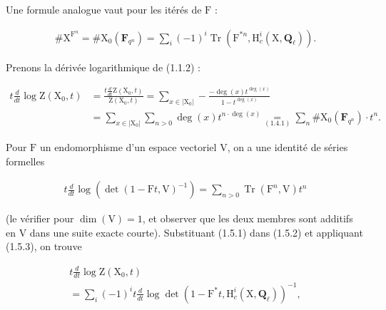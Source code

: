 \documentclass[10pt,leqno]{article}
\begin{document}
\noindent Une formule analogue vaut pour les itérés de \(\mathrm{F}\) :\par

\begin{equation*}\begin{gathered}\# \mathrm{X}^{\mathrm{F}^{n}} = \# \mathrm{X}_{0}(\mathbf{F}_{q^{n}}) = \sum _{i} (- 1)^{i} \operatorname{Tr}(\mathrm{F}^{*n}, \mathrm{H}_{c}^{i}(\mathrm{X}, \mathbf{Q}_{\ell })).\end{gathered}\tag{1.5.1}\end{equation*}

\noindent Prenons la dérivée logarithmique de (1.1.2) :\par

\begin{equation*}\begin{aligned}
t\frac{d}{dt}\log\mathrm Z(\mathrm X_0,t)&=\frac{t\frac{d}{dt}\mathrm Z(\mathrm X_0,t)}{\mathrm Z(\mathrm X_0,t)}
=\sum_{x\in|\mathrm X_0|}-\frac{-\deg(x)t^{\deg(x)}}{1-t^{\deg(x)}}\\
&=\sum_{x\in|\mathrm X_0|}\sum_{n>0}\deg(x)t^{n\cdot\deg(x)}
\underset{(1.4.1)}{=}\sum_n\#\mathrm X_0(\mathbf F_{q^n})\cdot t^n.
\end{aligned}\tag{1.5.2}\end{equation*}

\noindent Pour \(\mathrm{F}\) un endomorphisme d’un espace vectoriel \(\mathrm{V}\), on a une identité de séries formelles\par

\begin{equation*}\begin{gathered}t \frac{d}{dt} \operatorname{log}(\operatorname{det}(1- \mathrm{F}t, \mathrm{V})^{- 1}) = \sum _{n>0} \operatorname{Tr}(\mathrm{F}^{n}, \mathrm{V})t^{n}\end{gathered}\tag{1.5.3}\end{equation*}

\clearpage

\label{physical-5}

\noindent (le vérifier pour \(\operatorname{dim}(\mathrm{V})=1\), et observer que les deux membres sont additifs en \(\mathrm{V}\) dans une suite exacte courte). Substituant (1.5.1) dans (1.5.2) et appliquant (1.5.3), on trouve\par

\begin{equation*}\begin{gathered}t \frac{d}{dt} \operatorname{log} \mathrm{Z}(\mathrm{X}_{0},t) \\ = \sum _{i} (- 1)^{i} t \frac{d}{dt} \operatorname{log} \operatorname{det}(1- \mathrm{F}^{*}t, \mathrm{H}_{c}^{i}(\mathrm{X},\mathbf{Q}_{\ell }))^{- 1},\end{gathered}\end{equation*}
\end{document}
